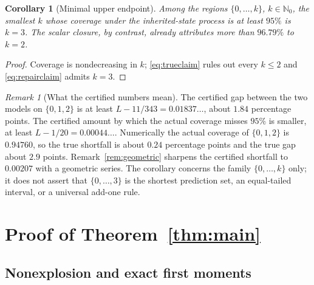 \documentclass[11pt,a4paper]{article}
\theoremstyle{plain}
\newtheorem{corollary}[theorem]{Corollary}
\theoremstyle{definition}
\theoremstyle{remark}
\newtheorem{remark}[theorem]{Remark}
\newcommand{\N}{\mathbb N}
\begin{document}
\begin{corollary}[Minimal upper endpoint]\label{cor:minimal}
Among the regions $\{0,\dots,k\}$, $k\in\N_0$, the smallest $k$ whose coverage under the inherited-state process is at least $95\%$ is $k=3$. The scalar closure, by contrast, already attributes more than $96.79\%$ to $k=2$.
\end{corollary}
\begin{proof}
Coverage is nondecreasing in $k$; \eqref{eq:trueclaim} rules out every $k\le2$ and \eqref{eq:repairclaim} admits $k=3$.
\end{proof}

\begin{remark}[What the certified numbers mean]
The certified gap between the two models on $\{0,1,2\}$ is at least $L-11/343=0.01837\ldots$, about $1.84$ percentage points. The certified amount by which the actual coverage misses $95\%$ is smaller, at least $L-1/20=0.00044\ldots$. Numerically the actual coverage of $\{0,1,2\}$ is $0.94760$, so the true shortfall is about $0.24$ percentage points and the true gap about $2.9$ points. Remark~\ref{rem:geometric} sharpens the certified shortfall to $0.00207$ with a geometric series. The corollary concerns the family $\{0,\dots,k\}$ only; it does not assert that $\{0,\dots,3\}$ is the shortest prediction set, an equal-tailed interval, or a universal add-one rule.
\end{remark}

\section{Proof of Theorem~\ref{thm:main}}\label{sec:proof}

\subsection{Nonexplosion and exact first moments}\label{sec:moments}
\end{document}
